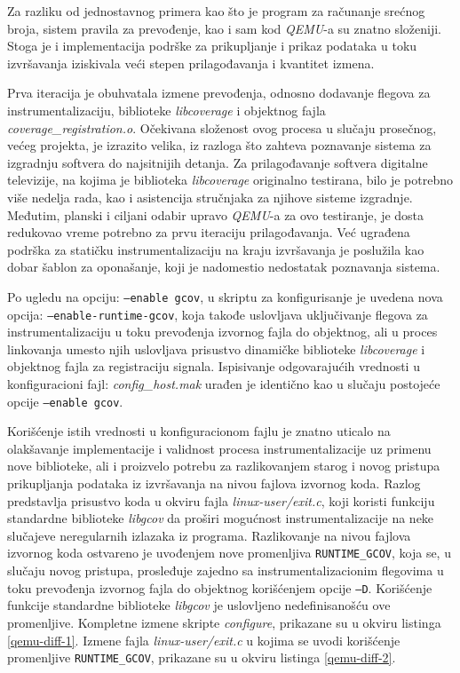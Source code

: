 \documentclass[12pt,oneside]{memoir}
\newcommand{\kod}[1]{\texttt{#1}}
\newcommand{\strano}[1]{\textit{#1}}
\begin{document}
Za razliku od jednostavnog primera kao što je program za računanje srećnog broja, sistem pravila za prevođenje, kao i sam kod \strano{QEMU}-a su znatno složeniji. Stoga je i implementacija podrške za prikupljanje i prikaz podataka u toku izvršavanja iziskivala veći stepen prilagođavanja i kvantitet izmena. 

Prva iteracija je obuhvatala izmene prevođenja, odnosno dodavanje flegova za instrumentalizaciju, biblioteke \strano{libcoverage} i objektnog fajla \strano{coverage\_registration.o}. 
Očekivana složenost ovog procesa u slučaju prosečnog, većeg projekta, je izrazito velika, iz razloga što zahteva poznavanje sistema za izgradnju softvera do najsitnijih detanja. Za prilagođavanje softvera digitalne televizije, na kojima je biblioteka \strano{libcoverage} originalno testirana, bilo je potrebno više nedelja rada, kao i asistencija stručnjaka za njihove sisteme izgradnje. Međutim, planski i ciljani odabir upravo \strano{QEMU}-a za ovo testiranje, je dosta redukovao vreme potrebno za prvu iteraciju prilagođavanja. Već ugrađena podrška za statičku instrumentalizaciju na kraju izvršavanja je poslužila kao dobar šablon za oponašanje, koji je nadomestio nedostatak poznavanja sistema. 

Po ugledu na opciju: \kod{--enable gcov}, u skriptu za konfigurisanje je uvedena nova opcija: \kod{--enable-runtime-gcov}, koja takođe uslovljava uključivanje flegova za instrumentalizaciju u toku prevođenja izvornog fajla do objektnog, ali u proces linkovanja umesto njih uslovljava prisustvo dinamičke biblioteke \strano{libcoverage} i objektnog fajla za registraciju signala. Ispisivanje odgovarajućih vrednosti u konfiguracioni fajl: \strano{config\_host.mak} urađen je identično kao u slučaju postojeće opcije \kod{--enable gcov}. 

Korišćenje istih vrednosti u konfiguracionom fajlu je znatno uticalo na olakšavanje implementacije i validnost procesa instrumentalizacije uz primenu nove biblioteke, ali i proizvelo potrebu za razlikovanjem starog i novog pristupa prikupljanja podataka iz izvršavanja na nivou fajlova izvornog koda. Razlog predstavlja prisustvo koda u okviru fajla \strano{linux-user/exit.c}, koji koristi funkciju standardne biblioteke \strano{libgcov} da proširi mogućnost instrumentalizacije na neke slučajeve neregularnih izlazaka iz programa. Razlikovanje na nivou fajlova izvornog koda ostvareno je uvođenjem nove promenljiva \kod{RUNTIME\_GCOV}, koja se, u slučaju novog pristupa, prosleđuje zajedno sa instrumentalizacionim flegovima u toku prevođenja izvornog fajla do objektnog korišćenjem opcije \kod{–D}. Korišćenje funkcije standardne biblioteke \strano{libgcov} je uslovljeno nedefinisanošću ove promenljive. Kompletne izmene skripte \strano{configure}, prikazane su u okviru listinga \ref{qemu-diff-1}. Izmene fajla \strano{linux-user/exit.c} u kojima se uvodi korišćenje promenljive \kod{RUNTIME\_GCOV}, prikazane su u okviru listinga \ref{qemu-diff-2}. \\
\end{document}
